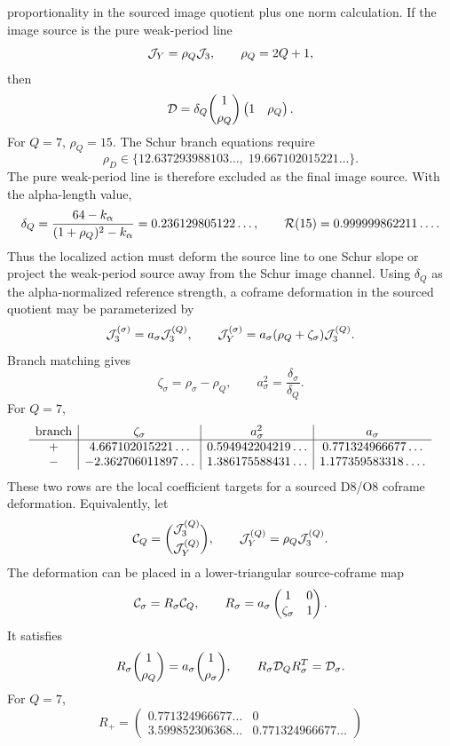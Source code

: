 \documentclass[11pt]{article}
\theoremstyle{definition}
\theoremstyle{remark}
\begin{document}
proportionality in the sourced image quotient plus one norm calculation.
If the image source is the pure weak-period line
\[
  {\cal J}_Y=\rho_Q{\cal J}_3,\qquad \rho_Q=2Q+1,
\]
then
\[
  {\cal D}
  =
  \delta_Q
  \binom{1}{\rho_Q}
  \begin{pmatrix}1&\rho_Q\end{pmatrix}.
\]
For \(Q=7\), \(\rho_Q=15\).  The Schur branch equations require
\[
  \rho_D
  \in
  \{12.637293988103\ldots,\;19.667102015221\ldots\}.
\]
The pure weak-period line is therefore excluded as the final image source.
With the alpha-length value,
\[
  \delta_Q
  =
  \frac{64-k_\alpha}{(1+\rho_Q)^2-k_\alpha}
  =
  0.236129805122\ldots,
  \qquad
  {\cal R}(15)=0.999999862211\ldots .
\]
Thus the localized action must deform the source line to one Schur slope or
project the weak-period source away from the Schur image channel.
Using \(\delta_Q\) as the alpha-normalized reference strength, a coframe
deformation in the sourced quotient may be parameterized by
\[
  {\cal J}_3^{(\sigma)}=a_\sigma{\cal J}_3^{(Q)},
  \qquad
  {\cal J}_Y^{(\sigma)}
  =
  a_\sigma(\rho_Q+\zeta_\sigma){\cal J}_3^{(Q)} .
\]
Branch matching gives
\[
  \zeta_\sigma=\rho_\sigma-\rho_Q,
  \qquad
  a_\sigma^2=\frac{\delta_\sigma}{\delta_Q}.
\]
For \(Q=7\),
\[
\begin{array}{c|c|c|c}
{\rm branch}&\zeta_\sigma&a_\sigma^2&a_\sigma\\ \hline
+&4.667102015221\ldots&0.594942204219\ldots&0.771324966677\ldots\\
-&-2.362706011897\ldots&1.386175588431\ldots&1.177359583318\ldots .
\end{array}
\]
These two rows are the local coefficient targets for a sourced D8/O8 coframe
deformation.
Equivalently, let
\[
  {\cal C}_Q=
  \binom{{\cal J}_3^{(Q)}}{{\cal J}_Y^{(Q)}},
  \qquad
  {\cal J}_Y^{(Q)}=\rho_Q{\cal J}_3^{(Q)} .
\]
The deformation can be placed in a lower-triangular source-coframe map
\[
  {\cal C}_\sigma=R_\sigma{\cal C}_Q,
  \qquad
  R_\sigma
  =
  a_\sigma
  \begin{pmatrix}
  1&0\\
  \zeta_\sigma&1
  \end{pmatrix}.
\]
It satisfies
\[
  R_\sigma\binom{1}{\rho_Q}
  =
  a_\sigma\binom{1}{\rho_\sigma},
  \qquad
  R_\sigma{\cal D}_QR_\sigma^T
  =
  {\cal D}_\sigma .
\]
For \(Q=7\),
\[
R_+
=
\begin{pmatrix}
0.771324966677\ldots&0\\
3.599852306368\ldots&0.771324966677\ldots
\end{pmatrix}
\]
\end{document}
